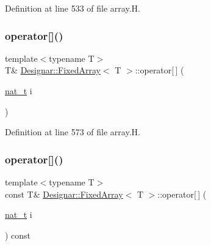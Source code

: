 Definition at line 533 of file array.\+H.

\mbox{\label{class_designar_1_1_fixed_array_a0116aa8effdf9fd0c56ef1a8c1fa2883}} 
\subsubsection{\texorpdfstring{operator[]()}{operator[]()}\hspace{0.1cm}{\footnotesize\ttfamily [1/2]}}
{\footnotesize\ttfamily template$<$typename T$>$ \\
T\& \hyperlink{class_designar_1_1_fixed_array}{Designar\+::\+Fixed\+Array}$<$ T $>$\+::operator\mbox{[}$\,$\mbox{]} (\begin{DoxyParamCaption}\item[{\hyperlink{namespace_designar_aa72662848b9f4815e7bf31a7cf3e33d1}{nat\+\_\+t}}]{i }\end{DoxyParamCaption})\hspace{0.3cm}{\ttfamily [inline]}}



Definition at line 573 of file array.\+H.

\mbox{\label{class_designar_1_1_fixed_array_aac0021d1ca6ff704f3d6967a509fff6b}} 
\subsubsection{\texorpdfstring{operator[]()}{operator[]()}\hspace{0.1cm}{\footnotesize\ttfamily [2/2]}}
{\footnotesize\ttfamily template$<$typename T$>$ \\
const T\& \hyperlink{class_designar_1_1_fixed_array}{Designar\+::\+Fixed\+Array}$<$ T $>$\+::operator\mbox{[}$\,$\mbox{]} (\begin{DoxyParamCaption}\item[{\hyperlink{namespace_designar_aa72662848b9f4815e7bf31a7cf3e33d1}{nat\+\_\+t}}]{i }\end{DoxyParamCaption}) const\hspace{0.3cm}{\ttfamily [inline]}}



